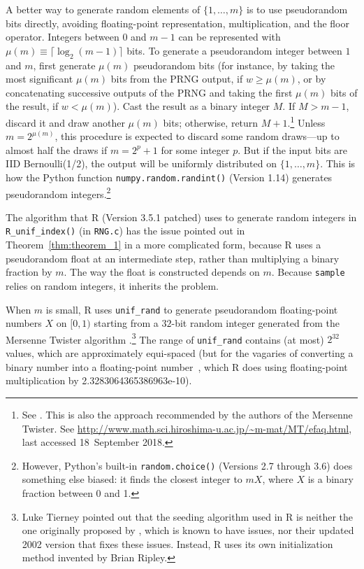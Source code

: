 \documentclass[12pt]{article}
\begin{document}
A better way to generate random elements of $\{1, \dots, m\}$ is to use pseudorandom bits directly,
avoiding floating-point representation, multiplication, and the floor operator. 
Integers between $0$ and $m-1$ can be represented with $\mu(m) \equiv \lceil \log_2(m-1) \rceil$ bits. 
To generate a pseudorandom integer between $1$ and $m$, first generate 
$\mu(m)$ pseudorandom bits (for instance, by taking the most significant $\mu(m)$ bits from the PRNG output, if $w \ge \mu(m)$, or by concatenating successive outputs of the PRNG and taking the
first $\mu(m)$ bits of the result, if $w < \mu(m)$).
Cast the result as a binary integer $M$.  
If $M > m-1$, discard it and draw another $\mu(m)$ bits; otherwise, return $M+1$.\footnote{%
   See \citet[p.114]{knuth_art_1997}.
   This is also the approach recommended by the authors of the Mersenne Twister. See
   \url{http://www.math.sci.hiroshima-u.ac.jp/~m-mat/MT/efaq.html}, last accessed 18~September 2018.
}
Unless $m = 2^{\mu(m)}$, this procedure is expected to discard some random draws---up to almost 
half the draws if $m = 2^p+1$ for some integer $p$.
But if the input bits are IID Bernoulli(1/2), the output will be uniformly distributed on $\{1, \ldots, m\}$.
This is how the Python function \texttt{numpy.random.randint()} (Version 1.14) generates pseudorandom integers.\footnote{%
  However, Python's built-in \texttt{random.choice()} (Versions 2.7 through 3.6) does 
  something else biased: it finds the closest integer to $mX$, where $X$ is a binary fraction 
  between 0 and 1.
}

The algorithm that R (Version 3.5.1 patched) \citep{R_2018} uses to generate random integers
in \texttt{R\_unif\_index()} (in \texttt{RNG.c})
has the issue pointed out in Theorem~\ref{thm:theorem_1} in a more complicated form, 
because R uses a pseudorandom float at an intermediate step, rather than multiplying a binary fraction
by $m$.
The way the float is constructed depends on $m$.
Because \texttt{sample} relies on random integers, it inherits the problem.

When $m$ is small, R uses \texttt{unif\_rand} to generate pseudorandom floating-point 
numbers $X$ on $[0, 1)$ starting from a $32$-bit random integer generated from the 
Mersenne Twister algorithm \citep{mt1998}.\footnote{ %
Luke Tierney pointed out that the seeding algorithm used in R is neither the one originally
proposed by \citet{mt1998}, which is known to have issues, nor their updated 2002 version
that fixes these issues.
Instead, R uses its own initialization method invented by Brian Ripley.} %
The range of \texttt{unif\_rand} contains 
(at most) $2^{32}$ values, which are approximately equi-spaced (but for the vagaries of converting
a binary number into a floating-point number~\citep{goldberg91}, which
R does using floating-point multiplication by 2.3283064365386963e-10).
\end{document}
